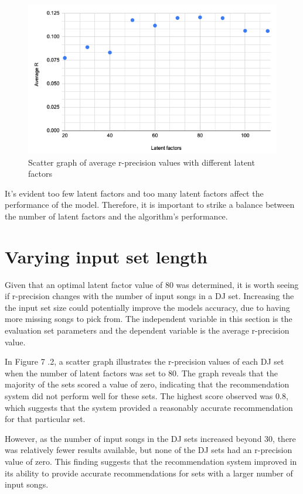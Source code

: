 \begin{figure}[H]
	\includegraphics[scale=0.6]{images/average_r_over_latent}
	\centering
	\caption{Scatter graph of average r-precision values with different latent factors} 
\end{figure}

It's evident too few latent factors and too many latent factors affect the performance of the model. Therefore, it is important to strike a balance between the number of latent factors and the algorithm's performance.

\section{Varying input set length}
Given that an optimal latent factor value of 80 was determined, it is worth seeing if r-precision changes with the number of input songs in a DJ set. Increasing the the input set size could potentially improve the models accuracy, due to having more missing songs to pick from. The independent variable in this section is the evaluation set parameters and the dependent variable is the average r-precision value.

In Figure 7	.2, a scatter graph illustrates the r-precision values of each DJ set when the number of latent factors was set to 80. The graph reveals that the majority of the sets scored a value of zero, indicating that the recommendation system did not perform well for these sets. The highest score observed was 0.8, which suggests that the system provided a reasonably accurate recommendation for that particular set.

However, as the number of input songs in the DJ sets increased beyond 30, there was relatively fewer results available, but none of the DJ sets had an r-precision value of zero. This finding suggests that the recommendation system improved in its ability to provide accurate recommendations for sets with a larger number of input songs.

